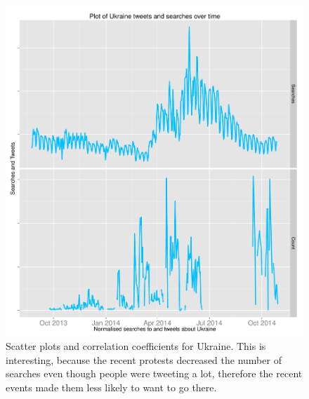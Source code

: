 \documentclass[minf,twoside,singlespacing,parskip,frontabs]{infthesis}
\begin{document}
\begin{figure}[]
\includegraphics[scale=0.6]{Ukraine}
\caption{Scatter plots and correlation coefficients for Ukraine. This is interesting, because the recent protests decreased the number of searches even though people were tweeting a lot, therefore the recent events made them less likely to want to go there. }
\end{figure}
\end{document}
